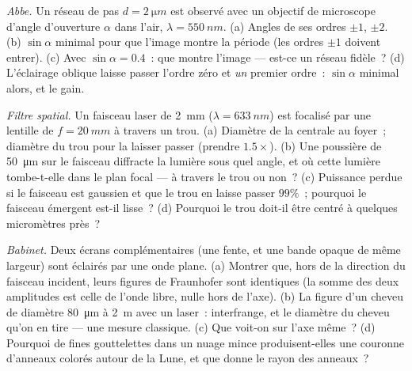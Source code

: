\begin{exercise}[$\star\star$]\label{exo:b2:diffraction:8}
\emph{Abbe.} Un réseau de pas $d = \qty{2}{\micro m}$ est observé avec un
objectif de microscope d'angle d'ouverture $\alpha$ dans l'air, $\lambda = \qty{550}{nm}$.
(a) Angles de ses ordres $\pm1$, $\pm2$. (b) $\sin\alpha$ minimal pour que l'image
montre la période (les ordres $\pm1$ doivent entrer). (c) Avec $\sin\alpha = 0.4$~: que
montre l'image --- est-ce un réseau fidèle~? (d) L'éclairage
oblique laisse passer l'ordre zéro et \emph{un} premier ordre~:
$\sin\alpha$ minimal alors, et le gain.
\end{exercise}

\begin{exercise}[$\star\star$]\label{exo:b2:diffraction:9}
\emph{Filtre spatial.} Un faisceau laser de \qty{2}{mm} ($\lambda = \qty{633}{nm}$) est
focalisé par une lentille de $f = \qty{20}{mm}$ à travers un trou. (a) Diamètre de
la  centrale au foyer~; diamètre du trou pour la laisser passer
(prendre $1.5\times$). (b) Une poussière de \qty{50}{\micro m} sur le faisceau
diffracte la lumière sous quel angle, et où cette lumière tombe-t-elle dans le
plan focal --- à travers le trou ou non~? (c) Puissance perdue si le faisceau
est gaussien et que le trou en laisse passer $99\%$~; pourquoi le faisceau
émergent est-il lisse~? (d) Pourquoi le trou doit-il être centré à quelques
micromètres près~?
\end{exercise}

\begin{exercise}[$\star\star\star$]\label{exo:b2:diffraction:10}
\emph{Babinet.} Deux écrans complémentaires (une fente, et une bande
opaque de même largeur) sont éclairés par une onde plane. (a) Montrer que, hors
de la direction du faisceau incident, leurs figures de Fraunhofer
sont identiques (la somme des deux amplitudes est celle de l'onde
libre, nulle hors de l'axe). (b) La figure d'un cheveu de
diamètre \qty{80}{\micro m} à \qty{2}{m} avec un laser~: interfrange, et le
diamètre du cheveu qu'on en tire --- une mesure classique. (c) Que voit-on
sur l'axe même~? (d) Pourquoi de fines gouttelettes dans un nuage mince produisent-elles une
couronne d'anneaux colorés autour de la Lune, et que donne le rayon des
anneaux~?
\end{exercise}

